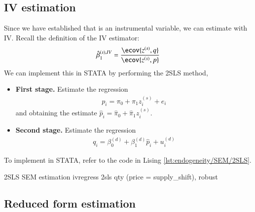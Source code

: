         \subsection{IV estimation}
            Since we have established that  is an instrumental variable, we can estimate  with IV. Recall the definition of the IV estimator:
            \begin{align}
                \hat\beta^{(s),IV}_1 = \frac{\ecov{z^{(s)},q}}{\ecov{z^{(s)},p}}
            \end{align}
            We can implement this in STATA by performing the 2SLS method,
            \begin{itemize}
                \item \textbf{First stage.} Estimate the regression
                \begin{align}
                    p_i = \pi_0 + \pi_1 z_i^{(s)} + e_i
                \end{align}
                and obtaining the estimate $\hat p_i = \hat\pi_0 + \hat\pi_1 z_i^{(s)}$.

                \item \textbf{Second stage.} Estimate the regression
                \begin{align}
                    q_i = \beta_0^{(d)} + \beta_1^{(d)} \hat p_i + u_i^{(d)}
                \end{align}
            \end{itemize}
            
            To implement in STATA, refer to the code in Lising \ref{lst:endogeneity/SEM/2SLS}.
            \begin{sexylisting}[colback=white, label=lst:endogeneity/SEM/2SLS]{2SLS SEM estimation}
ivregress 2sls qty (price = supply_shift), robust
            \end{sexylisting}

            
        \subsection{Reduced form estimation}

